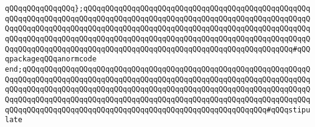 \newline
\verb|qQQqqQQqqQQqqQQq};qQQqqQQqqQQqqQQqqQQqqQQqqQQqqQQqqQQqqQQqqQQqqQQqqQQqqQQqqQQqqQQqqQQqqQQqqQQqqQQqqQQqqQQqqQQqqQQqqQQqqQQqqQQqqQQqqQQqqQQqqQQqqQQqqQQqqQQqqQQqqQQqqQQqqQQqqQQqqQQqqQQqqQQqqQQqqQQqqQQqqQQqqQQqqQQqqQQqqQQqqQQqqQQqqQQqqQQqqQQqqQQqqQQqqQQqqQQqqQQqqQQqqQQqqQQqqQQqqQQqqQQqqQQqqQQqqQQqqQQqqQQqqQQqqQQqqQQqqQQqqQQqqQQqqQQqqQQqqQQqqQQqqQQq#qQQqpackageqQQqanormcode|\newline
\verb|end;qQQqqQQqqQQqqQQqqQQqqQQqqQQqqQQqqQQqqQQqqQQqqQQqqQQqqQQqqQQqqQQqqQQqqQQqqQQqqQQqqQQqqQQqqQQqqQQqqQQqqQQqqQQqqQQqqQQqqQQqqQQqqQQqqQQqqQQqqQQqqQQqqQQqqQQqqQQqqQQqqQQqqQQqqQQqqQQqqQQqqQQqqQQqqQQqqQQqqQQqqQQqqQQqqQQqqQQqqQQqqQQqqQQqqQQqqQQqqQQqqQQqqQQqqQQqqQQqqQQqqQQqqQQqqQQqqQQqqQQqqQQqqQQqqQQqqQQqqQQqqQQqqQQqqQQqqQQqqQQqqQQqqQQqqQQqqQQq#qQQqstipulate|\newline
\newline


